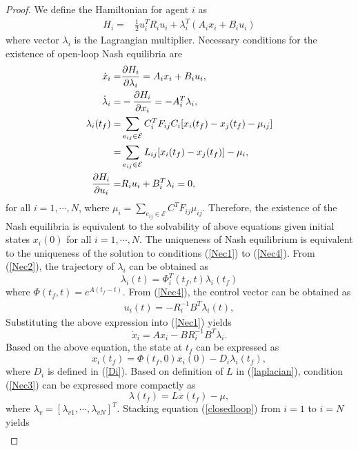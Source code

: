 \documentclass[10pt,doublecolumn]{IEEEtran}  %
\begin{document}
\begin{proof}
We define the Hamiltonian for agent $i$ as
\begin{align}
H_i=&\frac{1}{2}u_i^TR_iu_i+ \lambda_{i}^T(A_ix_i+B_iu_i)
\end{align}
where vector $\lambda_i$ is the Lagrangian multiplier. Necessary conditions for the existence of open-loop Nash equilibria are
\begin{subequations}\begin{align}
\dot{x}_{i}=&\frac{\partial H_i}{\partial \lambda_{i}}=A_ix_i+B_iu_i,\label{Nec1}\\ 
\dot{\lambda}_{i}=&-\frac{\partial H_i}{\partial x_{i}}= -A_i^T\lambda_i,\label{Nec2}\\
\lambda_{i}(t_f)=& \sum_{e_{ij}\in\mathcal{E}} C_i^TF_{ij}C_i[x_i(t_f)-x_j(t_f)-\mu_{ij}]\notag\\
=& \sum_{e_{ij}\in\mathcal{E}} L_{ij}[x_i(t_f)-x_j(t_f)]-\mu_i,\label{Nec3}\\
\frac{\partial H_i}{\partial u_i}=&R_iu_i+B^T_i\lambda_i =0,\label{Nec4}
\end{align}\label{Nec}
\end{subequations}
for all $i=1,\cdots,N$, where $\mu_i=\sum_{e_{ij}\in\mathcal{E}}C^TF_{ij}\mu_{ij}$. Therefore, the existence of the Nash equilibria is equivalent to the solvability of above equations given initial states $x_i(0)$ for all $i=1,\cdots,N$. The uniqueness of Nash equilibrium is equivalent to the uniqueness of the solution to conditions (\ref{Nec1}) to (\ref{Nec4}). From (\ref{Nec2}), the trajectory of $\lambda_i$ can be obtained as
\[\lambda_i(t)=\Phi_i^T(t_f,t)\lambda_i(t_f)\]
where $\Phi(t_f,t) = e^{A(t_f-t)}$. From (\ref{Nec4}), the control vector can be obtained as
\begin{align}
u_i(t)=-R_i^{-1}B^T\lambda_i(t),\label{ulambda}
\end{align}
Substituting the above expression into (\ref{Nec1}) yields
\[\dot{x}_i=Ax_i-BR_i^{-1}B^T\lambda_i.\]
Based on the above equation, the state at $t_f$ can be expressed as
\begin{equation}
x_i(t_f)=\Phi(t_f,0)x_i(0)- D_i\lambda_i(t_f),\label{closedloop}
\end{equation}
where $D_i$ is defined in (\ref{Di}). Based on definition of $L$ in (\ref{laplacian}), condition (\ref{Nec3}) can be expressed more compactly as
\[\lambda(t_f)=Lx(t_f)-\mu,\]
where $\lambda_v=[\lambda_{v1},\cdots,\lambda_{vN}]^T$. Stacking equation (\ref{closedloop}) from $i=1$ to $i=N$ yields
\begin{align*}

\end{align*}
\end{proof}
\end{document}

